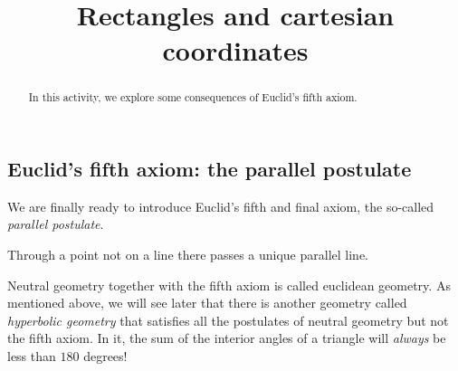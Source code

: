 \documentclass[newpage,hints,handout,noauthor,nooutcomes,12pt]{ximera}
\title{Rectangles and cartesian coordinates}
\begin{document}
\begin{abstract}
In this activity, we explore some consequences of Euclid's fifth
axiom.
\end{abstract}
\maketitle

\subsection{Euclid's fifth axiom: the parallel postulate}

We are finally ready to introduce Euclid's fifth and final axiom, the
so-called \textit{parallel postulate}.

\begin{axiom}
Through a point not on a line there passes a unique parallel line.
\end{axiom}

Neutral geometry together with the fifth axiom is called euclidean
geometry. As mentioned above, we will see later that there is another
geometry called \textit{hyperbolic geometry} that satisfies all the
postulates of neutral geometry but not the fifth axiom. In it, the sum
of the interior angles of a triangle will \textit{always} be less than
$180$ degrees!
\end{document}
